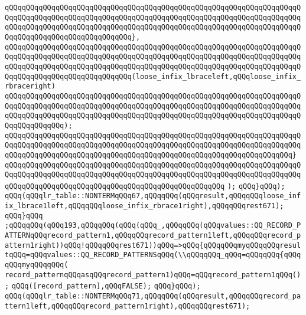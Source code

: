 \verb|qQQqqQQqqQQqqQQqqQQqqQQqqQQqqQQqqQQqqQQqqQQqqQQqqQQqqQQqqQQqqQQqqQQqqQQqqQQqqQQqqQQqqQQqqQQqqQQqqQQqqQQqqQQqqQQqqQQqqQQqqQQqqQQqqQQqqQQqqQQqqQQqqQQqqQQqqQQqqQQqqQQqqQQqqQQqqQQqqQQqqQQqqQQqqQQqqQQqqQQqqQQqqQQqqQQqqQQqqQQqqQQqqQQqqQQqqQQqqQQq},|\newline
\verb|qQQqqQQqqQQqqQQqqQQqqQQqqQQqqQQqqQQqqQQqqQQqqQQqqQQqqQQqqQQqqQQqqQQqqQQqqQQqqQQqqQQqqQQqqQQqqQQqqQQqqQQqqQQqqQQqqQQqqQQqqQQqqQQqqQQqqQQqqQQqqQQqqQQqqQQqqQQqqQQqqQQqqQQqqQQqqQQqqQQqqQQqqQQqqQQqqQQqqQQqqQQqqQQqqQQqqQQqqQQqqQQqqQQqqQQqqQQqqQQq(loose_infix_lbraceleft,qQQqloose_infix_rbraceright)|\newline
\verb|qQQqqQQqqQQqqQQqqQQqqQQqqQQqqQQqqQQqqQQqqQQqqQQqqQQqqQQqqQQqqQQqqQQqqQQqqQQqqQQqqQQqqQQqqQQqqQQqqQQqqQQqqQQqqQQqqQQqqQQqqQQqqQQqqQQqqQQqqQQqqQQqqQQqqQQqqQQqqQQqqQQqqQQqqQQqqQQqqQQqqQQqqQQqqQQqqQQqqQQqqQQqqQQqqQQqqQQqqQQqqQQq);|\newline
\verb|qQQqqQQqqQQqqQQqqQQqqQQqqQQqqQQqqQQqqQQqqQQqqQQqqQQqqQQqqQQqqQQqqQQqqQQqqQQqqQQqqQQqqQQqqQQqqQQqqQQqqQQqqQQqqQQqqQQqqQQqqQQqqQQqqQQqqQQqqQQqqQQqqQQqqQQqqQQqqQQqqQQqqQQqqQQqqQQqqQQqqQQqqQQqqQQqqQQqqQQqqQQqqQQq}|\newline
\verb|qQQqqQQqqQQqqQQqqQQqqQQqqQQqqQQqqQQqqQQqqQQqqQQqqQQqqQQqqQQqqQQqqQQqqQQqqQQqqQQqqQQqqQQqqQQqqQQqqQQqqQQqqQQqqQQqqQQqqQQqqQQqqQQqqQQqqQQqqQQqqQQqqQQqqQQqqQQqqQQqqQQqqQQqqQQqqQQqqQQqqQQqqQQqqQQq|\newline
\verb|);|\newline
\verb|qQQq}qQQq);|\newline
\verb|qQQq(qQQqlr_table::NONTERMqQQq67,qQQqqQQq(qQQqresult,qQQqqQQqloose_infix_lbrace1left,qQQqqQQqloose_infix_rbrace1right),qQQqqQQqrest671);|\newline
\verb|qQQq}qQQq|\newline
\verb|;qQQqqQQq(qQQq193,qQQqqQQq(qQQq(qQQq_,qQQqqQQq(qQQqvalues::QQ_RECORD_PATTERNqQQqrecord_pattern1,qQQqqQQqrecord_pattern1left,qQQqqQQqrecord_pattern1right))qQQq!qQQqqQQqrest671))qQQq=>qQQq{qQQqqQQqmyqQQqqQQqresultqQQq=qQQqvalues::QQ_RECORD_PATTERNSqQQq(\\qQQqqQQq_qQQq=qQQqqQQq{qQQqqQQqmyqQQqqQQq(|\newline
\verb|record_patternqQQqasqQQqrecord_pattern1)qQQq=qQQqrecord_pattern1qQQq();|\newline
\verb|qQQq([record_pattern],qQQqFALSE);|\newline
\verb|qQQq}qQQq);|\newline
\verb|qQQq(qQQqlr_table::NONTERMqQQq71,qQQqqQQq(qQQqresult,qQQqqQQqrecord_pattern1left,qQQqqQQqrecord_pattern1right),qQQqqQQqrest671);|\newline
